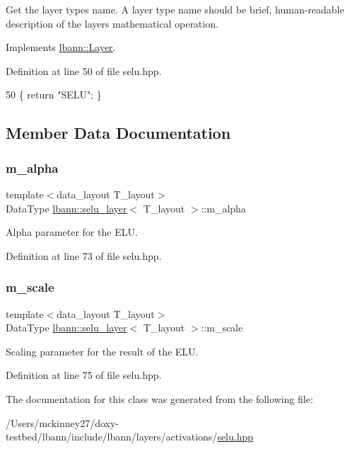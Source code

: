 Get the layer type\textquotesingle{}s name. A layer type name should be brief, human-\/readable description of the layer\textquotesingle{}s mathematical operation. 

Implements \hyperlink{classlbann_1_1Layer_a0fa0ea9160b490c151c0a17fde4f7239}{lbann\+::\+Layer}.



Definition at line 50 of file selu.\+hpp.


\begin{DoxyCode}
50 \{ \textcolor{keywordflow}{return} \textcolor{stringliteral}{"SELU"}; \}
\end{DoxyCode}


\subsection{Member Data Documentation}
\mbox{\label{classlbann_1_1selu__layer_a72b22e92f3e70f6b996329e5b170554e}} 
\subsubsection{\texorpdfstring{m\+\_\+alpha}{m\_alpha}}
{\footnotesize\ttfamily template$<$data\+\_\+layout T\+\_\+layout$>$ \\
Data\+Type \hyperlink{classlbann_1_1selu__layer}{lbann\+::selu\+\_\+layer}$<$ T\+\_\+layout $>$\+::m\+\_\+alpha\hspace{0.3cm}{\ttfamily [private]}}

Alpha parameter for the E\+LU. 

Definition at line 73 of file selu.\+hpp.

\mbox{\label{classlbann_1_1selu__layer_a9575be8104b1b24232a2d167405e693a}} 
\subsubsection{\texorpdfstring{m\+\_\+scale}{m\_scale}}
{\footnotesize\ttfamily template$<$data\+\_\+layout T\+\_\+layout$>$ \\
Data\+Type \hyperlink{classlbann_1_1selu__layer}{lbann\+::selu\+\_\+layer}$<$ T\+\_\+layout $>$\+::m\+\_\+scale\hspace{0.3cm}{\ttfamily [private]}}

Scaling parameter for the result of the E\+LU. 

Definition at line 75 of file selu.\+hpp.



The documentation for this class was generated from the following file\+:\begin{DoxyCompactItemize}
\item 
/\+Users/mckinney27/doxy-\/testbed/lbann/include/lbann/layers/activations/\hyperlink{selu_8hpp}{selu.\+hpp}\end{DoxyCompactItemize}

